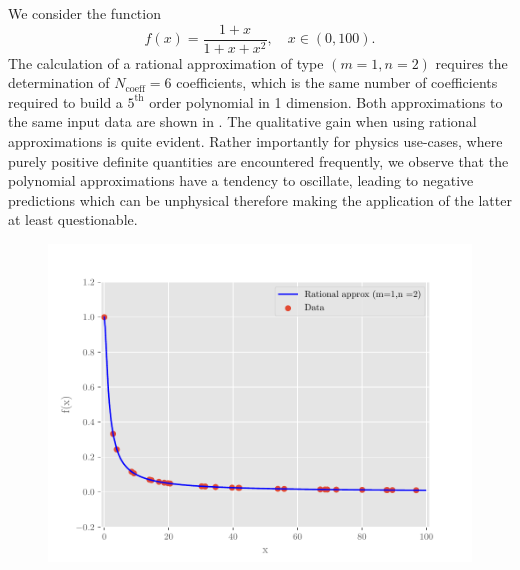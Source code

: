 We consider the function $$f(x) = \frac{1 + x}{1 + x + x^2},\quad
x\in(0,100).$$ The calculation of a rational approximation of type $(m=1, n=2)$
requires the determination of $N_\text{coeff}=6$ coefficients, which is the
same number of coefficients required to build a $5^\text{th}$ order polynomial
in 1 dimension.  Both approximations to the same input data are shown in
. The qualitative gain when using rational approximations is
quite evident. Rather importantly for physics use-cases, where purely positive
definite quantities are encountered frequently, we observe that the polynomial
approximations have a tendency to oscillate, leading to negative predictions
which can be unphysical therefore making the application of the latter at least
questionable.

\begin{figure}
    \begin{minipage}{.48\textwidth}%
        \begin{center}
            \includegraphics[width=.98\textwidth]{code/test04_01_2.pdf}
        \end{center}
    \end{minipage}%
    \begin{minipage}{.04\textwidth}%
    \end{minipage}%
    \begin{minipage}{.48\textwidth}%
        \begin{center}

\end{center}
\end{minipage}
\end{figure}
